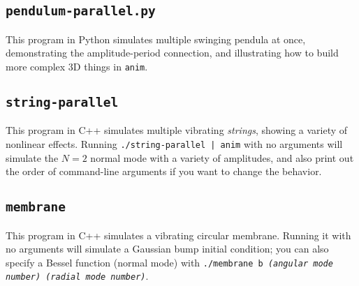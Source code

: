 \documentclass[12pt]{article}
\begin{document}
\subsection{\tt pendulum-parallel.py}

This program in Python simulates multiple swinging pendula at once, demonstrating
the amplitude-period connection, and illustrating how to build more complex 3D
things in {\tt anim}.

\subsection{\tt string-parallel}

This program in C++ simulates multiple vibrating {\it strings}, showing a variety
of nonlinear effects. Running {\tt ./string-parallel | anim} with no arguments
will simulate the $N=2$ normal mode with a variety of amplitudes, and also print out
the order of command-line arguments if you want to change the behavior.

\subsection{\tt membrane}

This program in C++ simulates a vibrating circular membrane. Running it with no arguments
will simulate a Gaussian bump initial condition; you can also specify a Bessel function
(normal mode)
with {\tt ./membrane b \it (angular mode number) (radial mode number)}.
\end{document}
